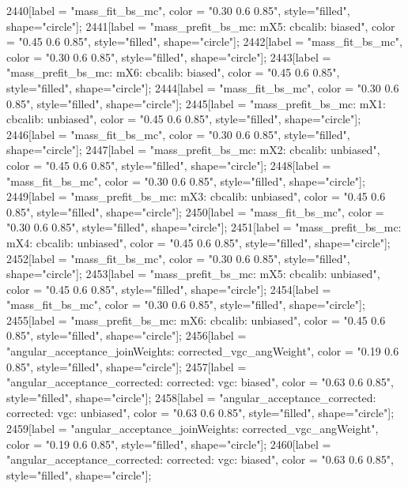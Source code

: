 {	2440[label = "mass_fit_bs_mc", color = "0.30 0.6 0.85", style="filled", shape="circle"];
	2441[label = "mass_prefit_bs_mc\nmassbin: mX5\nmassmodel: cbcalib\ntrigger: biased", color = "0.45 0.6 0.85", style="filled", shape="circle"];
	2442[label = "mass_fit_bs_mc", color = "0.30 0.6 0.85", style="filled", shape="circle"];
	2443[label = "mass_prefit_bs_mc\nmassbin: mX6\nmassmodel: cbcalib\ntrigger: biased", color = "0.45 0.6 0.85", style="filled", shape="circle"];
	2444[label = "mass_fit_bs_mc", color = "0.30 0.6 0.85", style="filled", shape="circle"];
	2445[label = "mass_prefit_bs_mc\nmassbin: mX1\nmassmodel: cbcalib\ntrigger: unbiased", color = "0.45 0.6 0.85", style="filled", shape="circle"];
	2446[label = "mass_fit_bs_mc", color = "0.30 0.6 0.85", style="filled", shape="circle"];
	2447[label = "mass_prefit_bs_mc\nmassbin: mX2\nmassmodel: cbcalib\ntrigger: unbiased", color = "0.45 0.6 0.85", style="filled", shape="circle"];
	2448[label = "mass_fit_bs_mc", color = "0.30 0.6 0.85", style="filled", shape="circle"];
	2449[label = "mass_prefit_bs_mc\nmassbin: mX3\nmassmodel: cbcalib\ntrigger: unbiased", color = "0.45 0.6 0.85", style="filled", shape="circle"];
	2450[label = "mass_fit_bs_mc", color = "0.30 0.6 0.85", style="filled", shape="circle"];
	2451[label = "mass_prefit_bs_mc\nmassbin: mX4\nmassmodel: cbcalib\ntrigger: unbiased", color = "0.45 0.6 0.85", style="filled", shape="circle"];
	2452[label = "mass_fit_bs_mc", color = "0.30 0.6 0.85", style="filled", shape="circle"];
	2453[label = "mass_prefit_bs_mc\nmassbin: mX5\nmassmodel: cbcalib\ntrigger: unbiased", color = "0.45 0.6 0.85", style="filled", shape="circle"];
	2454[label = "mass_fit_bs_mc", color = "0.30 0.6 0.85", style="filled", shape="circle"];
	2455[label = "mass_prefit_bs_mc\nmassbin: mX6\nmassmodel: cbcalib\ntrigger: unbiased", color = "0.45 0.6 0.85", style="filled", shape="circle"];
	2456[label = "angular_acceptance_joinWeights\nwflag: corrected_vgc_angWeight", color = "0.19 0.6 0.85", style="filled", shape="circle"];
	2457[label = "angular_acceptance_corrected\nangacc: corrected\ncsp: vgc\ntrigger: biased", color = "0.63 0.6 0.85", style="filled", shape="circle"];
	2458[label = "angular_acceptance_corrected\nangacc: corrected\ncsp: vgc\ntrigger: unbiased", color = "0.63 0.6 0.85", style="filled", shape="circle"];
	2459[label = "angular_acceptance_joinWeights\nwflag: corrected_vgc_angWeight", color = "0.19 0.6 0.85", style="filled", shape="circle"];
	2460[label = "angular_acceptance_corrected\nangacc: corrected\ncsp: vgc\ntrigger: biased", color = "0.63 0.6 0.85", style="filled", shape="circle"];
}
